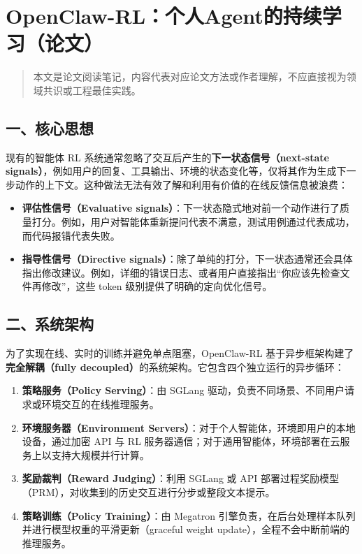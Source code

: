 \clearpage

\hypertarget{openclaw-rlux4e2aux4ebaagentux7684ux6301ux7eedux5b66ux4e60ux8bbaux6587}{%
\section{OpenClaw-RL：个人Agent的持续学习（论文）}\label{openclaw-rlux4e2aux4ebaagentux7684ux6301ux7eedux5b66ux4e60ux8bbaux6587}}

\begin{quote}
本文是论文阅读笔记，内容代表对应论文方法或作者理解，不应直接视为领域共识或工程最佳实践。
\end{quote}

\hypertarget{ux4e00ux6838ux5fc3ux601dux60f3-15}{%
\subsection{一、核心思想}\label{ux4e00ux6838ux5fc3ux601dux60f3-15}}

现有的智能体 RL 系统通常忽略了交互后产生的\textbf{下一状态信号（next-state signals）}，例如用户的回复、工具输出、环境的状态变化等，仅将其作为生成下一步动作的上下文。这种做法无法有效了解和利用有价值的在线反馈信息被浪费：

\begin{itemize}
\tightlist
\item
  \textbf{评估性信号（Evaluative signals）}：下一状态隐式地对前一个动作进行了质量打分。例如，用户对智能体重新提问代表不满意，测试用例通过代表成功，而代码报错代表失败。
\item
  \textbf{指导性信号（Directive signals）}：除了单纯的打分，下一状态通常还会具体指出修改建议。例如，详细的错误日志、或者用户直接指出``你应该先检查文件再修改''，这些 token 级别提供了明确的定向优化信号。
\end{itemize}

\hypertarget{ux4e8cux7cfbux7edfux67b6ux6784}{%
\subsection{二、系统架构}\label{ux4e8cux7cfbux7edfux67b6ux6784}}

为了实现在线、实时的训练并避免单点阻塞，OpenClaw-RL 基于异步框架构建了\textbf{完全解耦（fully decoupled）}的系统架构。它包含四个独立运行的异步循环：

\begin{enumerate}
\def\labelenumi{\arabic{enumi}.}
\tightlist
\item
  \textbf{策略服务（Policy Serving）}：由 SGLang 驱动，负责不同场景、不同用户请求或环境交互的在线推理服务。
\item
  \textbf{环境服务器（Environment Servers）}：对于个人智能体，环境即用户的本地设备，通过加密 API 与 RL 服务器通信；对于通用智能体，环境部署在云服务上以支持大规模并行计算。
\item
  \textbf{奖励裁判（Reward Judging）}：利用 SGLang 或 API 部署过程奖励模型（PRM），对收集到的历史交互进行分步或整段文本提示。
\item
  \textbf{策略训练（Policy Training）}：由 Megatron 引擎负责，在后台处理样本队列并进行模型权重的平滑更新（graceful weight update），全程不会中断前端的推理服务。
\end{enumerate}

